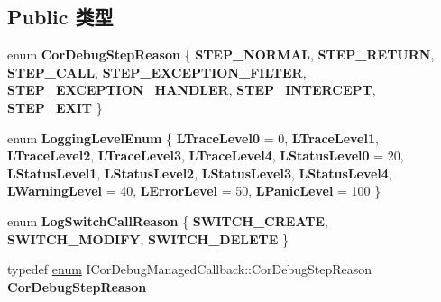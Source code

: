 \subsection*{Public 类型}
\begin{DoxyCompactItemize}
\item 
\mbox{\label{interface_i_cor_debug_managed_callback_ac6aaeff4ea57e5c2bf634e0781e94a59}} 
enum {\bfseries Cor\+Debug\+Step\+Reason} \{ \newline
{\bfseries S\+T\+E\+P\+\_\+\+N\+O\+R\+M\+AL}, 
{\bfseries S\+T\+E\+P\+\_\+\+R\+E\+T\+U\+RN}, 
{\bfseries S\+T\+E\+P\+\_\+\+C\+A\+LL}, 
{\bfseries S\+T\+E\+P\+\_\+\+E\+X\+C\+E\+P\+T\+I\+O\+N\+\_\+\+F\+I\+L\+T\+ER}, 
\newline
{\bfseries S\+T\+E\+P\+\_\+\+E\+X\+C\+E\+P\+T\+I\+O\+N\+\_\+\+H\+A\+N\+D\+L\+ER}, 
{\bfseries S\+T\+E\+P\+\_\+\+I\+N\+T\+E\+R\+C\+E\+PT}, 
{\bfseries S\+T\+E\+P\+\_\+\+E\+X\+IT}
 \}
\item 
\mbox{\label{interface_i_cor_debug_managed_callback_a7fa1eeaf5527eb9bcb877226a375ba84}} 
enum {\bfseries Logging\+Level\+Enum} \{ \newline
{\bfseries L\+Trace\+Level0} = 0, 
{\bfseries L\+Trace\+Level1}, 
{\bfseries L\+Trace\+Level2}, 
{\bfseries L\+Trace\+Level3}, 
\newline
{\bfseries L\+Trace\+Level4}, 
{\bfseries L\+Status\+Level0} = 20, 
{\bfseries L\+Status\+Level1}, 
{\bfseries L\+Status\+Level2}, 
\newline
{\bfseries L\+Status\+Level3}, 
{\bfseries L\+Status\+Level4}, 
{\bfseries L\+Warning\+Level} = 40, 
{\bfseries L\+Error\+Level} = 50, 
\newline
{\bfseries L\+Panic\+Level} = 100
 \}
\item 
\mbox{\label{interface_i_cor_debug_managed_callback_a0250ff894d0755467ad1ac58c2185980}} 
enum {\bfseries Log\+Switch\+Call\+Reason} \{ {\bfseries S\+W\+I\+T\+C\+H\+\_\+\+C\+R\+E\+A\+TE}, 
{\bfseries S\+W\+I\+T\+C\+H\+\_\+\+M\+O\+D\+I\+FY}, 
{\bfseries S\+W\+I\+T\+C\+H\+\_\+\+D\+E\+L\+E\+TE}
 \}
\item 
\mbox{\label{interface_i_cor_debug_managed_callback_a5c350ece7ba90da9075d9f2b92bb7b7c}} 
typedef \hyperlink{interfaceenum}{enum} I\+Cor\+Debug\+Managed\+Callback\+::\+Cor\+Debug\+Step\+Reason {\bfseries Cor\+Debug\+Step\+Reason}

\end{DoxyCompactItemize}
